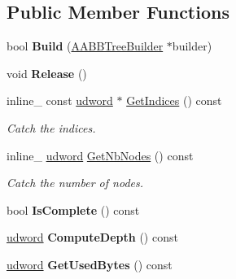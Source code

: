 \subsection*{Public Member Functions}
\begin{DoxyCompactItemize}
\item 
bool {\bfseries Build} (\hyperlink{classAABBTreeBuilder}{A\+A\+B\+B\+Tree\+Builder} $\ast$builder)\hypertarget{classAABBTree_a4cc7addadfb139b13288d09b7fe5f3ad}{}\label{classAABBTree_a4cc7addadfb139b13288d09b7fe5f3ad}

\item 
void {\bfseries Release} ()\hypertarget{classAABBTree_a5afb9bb2637b341242003ba2df1378f9}{}\label{classAABBTree_a5afb9bb2637b341242003ba2df1378f9}

\item 
inline\+\_\+ const \hyperlink{IceTypes_8h_a44c6f1920ba5551225fb534f9d1a1733}{udword} $\ast$ \hyperlink{classAABBTree_a71f0c0c2593f20c034dd5a90534c082c}{Get\+Indices} () const \hypertarget{classAABBTree_a71f0c0c2593f20c034dd5a90534c082c}{}\label{classAABBTree_a71f0c0c2593f20c034dd5a90534c082c}

\begin{DoxyCompactList}\small\item\em Catch the indices. \end{DoxyCompactList}\item 
inline\+\_\+ \hyperlink{IceTypes_8h_a44c6f1920ba5551225fb534f9d1a1733}{udword} \hyperlink{classAABBTree_a1726969e74677384364703bb246addb8}{Get\+Nb\+Nodes} () const \hypertarget{classAABBTree_a1726969e74677384364703bb246addb8}{}\label{classAABBTree_a1726969e74677384364703bb246addb8}

\begin{DoxyCompactList}\small\item\em Catch the number of nodes. \end{DoxyCompactList}\item 
bool {\bfseries Is\+Complete} () const \hypertarget{classAABBTree_af03ae8eaa80a889ef6c715a0c9313c7a}{}\label{classAABBTree_af03ae8eaa80a889ef6c715a0c9313c7a}

\item 
\hyperlink{IceTypes_8h_a44c6f1920ba5551225fb534f9d1a1733}{udword} {\bfseries Compute\+Depth} () const \hypertarget{classAABBTree_a0f9b2f254109393c75dad19f1d63cc3c}{}\label{classAABBTree_a0f9b2f254109393c75dad19f1d63cc3c}

\item 
\hyperlink{IceTypes_8h_a44c6f1920ba5551225fb534f9d1a1733}{udword} {\bfseries Get\+Used\+Bytes} () const \hypertarget{classAABBTree_a2d646d050c93b9600c74a27259d39882}{}\label{classAABBTree_a2d646d050c93b9600c74a27259d39882}


\end{DoxyCompactItemize}
